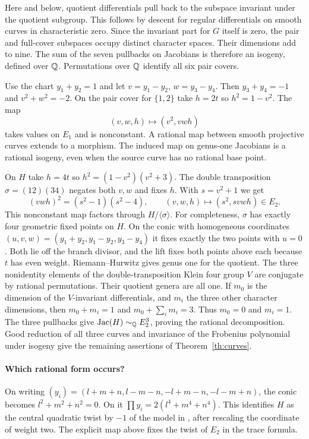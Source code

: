 \documentclass[11pt]{article}
\begin{document}
Here and below, quotient differentials pull back to the subspace
invariant under the quotient subgroup. This follows by descent for
regular differentials on smooth curves in characteristic zero. Since
the invariant part for $G$ itself is zero, the pair and full-cover
subspaces occupy distinct character spaces. Their dimensions add to
nine. The sum of the seven pullbacks on Jacobians is therefore an
isogeny, defined over $\mathbb Q$. Permutations over $\mathbb Q$ identify all six
pair covers.

Use the chart $y_1+y_2=1$ and let $v=y_1-y_2$, $w=y_3-y_4$.
Then $y_3+y_4=-1$ and $v^2+w^2=-2$. On the pair cover for
$\{1,2\}$ take $h=2t$ so $h^2=1-v^2$. The map
\[
 (v,w,h)\longmapsto (v^2,vwh)
\]
takes values on $E_1$ and is nonconstant. A rational map between
smooth projective curves extends to a morphism. The induced map
on genus-one Jacobians is a rational isogeny, even when the source
curve has no rational base point.

On $H$ take $h=4t$ so $h^2=(1-v^2)(v^2+3)$. The double
transposition $\sigma=(12)(34)$ negates both $v,w$ and fixes $h$.
With $s=v^2+1$ we get
\[
 (vwh)^2=(s^2-1)(s^2-4),\qquad
 (v,w,h)\longmapsto(s^2,s vwh)\in E_2 .
\]
This nonconstant map factors through $H/\langle\sigma\rangle$.
For completeness, $\sigma$ has exactly four geometric fixed points
on $H$. On the conic with homogeneous coordinates
$(u,v,w)=(y_1+y_2,y_1-y_2,y_3-y_4)$ it fixes exactly the two
points with $u=0$. Both lie off the branch divisor, and the lift
fixes both points above each because $t$ has even weight.
Riemann--Hurwitz gives genus one for the quotient. The three
nonidentity elements of the double-transposition Klein four group
$V$ are conjugate by rational permutations. Their quotient genera
are all one. If $m_0$ is the dimension of the $V$-invariant
differentials, and $m_i$ the three other character dimensions, then
$m_0+m_i=1$ and $m_0+\sum_i m_i=3$. Thus $m_0=0$ and $m_i=1$.
The three pullbacks give $\operatorname{Jac}(H)\sim_{\mathbb Q} E_2^3$, proving the
rational decomposition. Good reduction of all three curves and
invariance of the Frobenius polynomial under isogeny give the
remaining assertions of Theorem~\ref{th:curves}.

\paragraph{Which rational form occurs?}
On writing $(y_i)=(l+m+n,l-m-n,-l+m-n,-l-m+n)$, the conic
becomes $l^2+m^2+n^2=0$. On it $\prod y_i=2(l^4+m^4+n^4)$.
This identifies $H$ as the central quadratic twist by $-1$ of
the model in \cite[Eq.~(1.4.1)]{arora}, after rescaling the
coordinate of weight two. The explicit map above fixes the twist
of $E_2$ in the trace formula.
\end{document}
